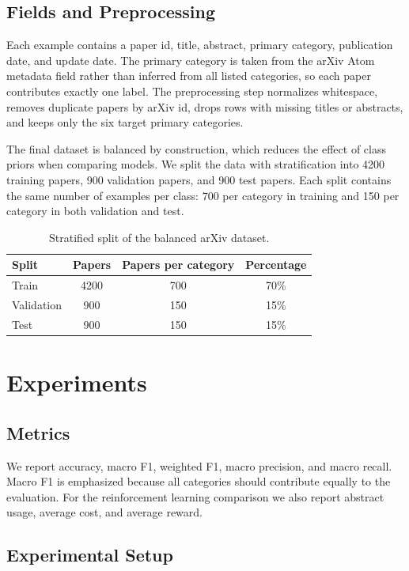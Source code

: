 \documentclass{article}
\begin{document}
\subsection{Fields and Preprocessing}

Each example contains a paper id, title, abstract, primary category, publication date, and update date. The primary category is taken from the arXiv Atom metadata field rather than inferred from all listed categories, so each paper contributes exactly one label. The preprocessing step normalizes whitespace, removes duplicate papers by arXiv id, drops rows with missing titles or abstracts, and keeps only the six target primary categories.

The final dataset is balanced by construction, which reduces the effect of class priors when comparing models. We split the data with stratification into 4200 training papers, 900 validation papers, and 900 test papers. Each split contains the same number of examples per class: 700 per category in training and 150 per category in both validation and test.

\begin{table}[tbh]
\centering
\begin{tabular}{|l|c|c|c|}
\hline
Split & Papers & Papers per category & Percentage \\
\hline
Train & 4200 & 700 & 70\% \\
Validation & 900 & 150 & 15\% \\
Test & 900 & 150 & 15\% \\
\hline
\end{tabular}
\caption{Stratified split of the balanced arXiv dataset.}
\label{tab:dataset}
\end{table}

\section{Experiments}

\subsection{Metrics}

We report accuracy, macro F1, weighted F1, macro precision, and macro recall. Macro F1 is emphasized because all categories should contribute equally to the evaluation. For the reinforcement learning comparison we also report abstract usage, average cost, and average reward.

\subsection{Experimental Setup}
\end{document}
